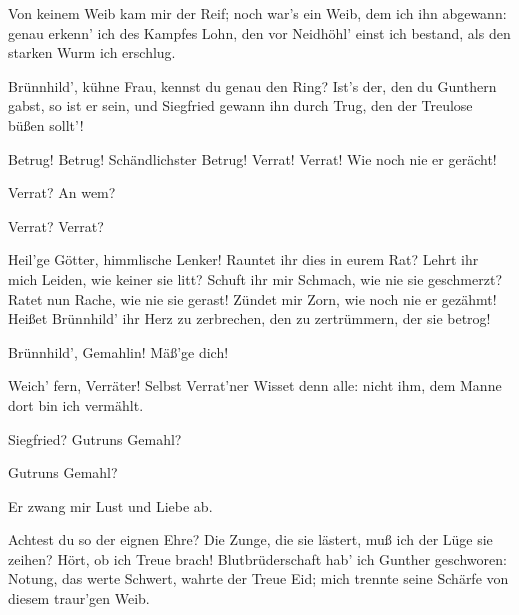 \begin{drama}


\Siegfriedspeaks

Von keinem Weib kam mir der Reif;
noch war's ein Weib, dem ich ihn abgewann:
genau erkenn' ich des Kampfes Lohn,
den vor Neidhöhl' einst ich bestand,
als den starken Wurm ich erschlug.
 

\Hagenspeaks



Brünnhild', kühne Frau,
kennst du genau den Ring?
Ist's der, den du Gunthern gabst,
so ist er sein,
und Siegfried gewann ihn durch Trug,
den der Treulose büßen sollt'!
 

\Brunnhildespeaks



Betrug! Betrug! Schändlichster Betrug!
Verrat! Verrat! Wie noch nie er gerächt!
 

\Gutrunespeaks

Verrat? An wem?
 

Verrat? Verrat?
 

\Brunnhildespeaks

Heil'ge Götter, himmlische Lenker!
Rauntet ihr dies in eurem Rat?
Lehrt ihr mich Leiden, wie keiner sie litt?
Schuft ihr mir Schmach, wie nie sie geschmerzt?
Ratet nun Rache, wie nie sie gerast!
Zündet mir Zorn, wie noch nie er gezähmt!
Heißet Brünnhild' ihr Herz zu zerbrechen,
den zu zertrümmern, der sie betrog!
 

\Guntherspeaks

Brünnhild', Gemahlin!
Mäß'ge dich!
 

\Brunnhildespeaks

Weich' fern, Verräter!
Selbst Verrat'ner
Wisset denn alle: nicht ihm,
dem Manne dort bin ich vermählt.
 

Siegfried? Gutruns Gemahl?
 

Gutruns Gemahl?
 

\Brunnhildespeaks

Er zwang mir Lust und Liebe ab.
 

\Siegfriedspeaks

Achtest du so der eignen Ehre?
Die Zunge, die sie lästert,
muß ich der Lüge sie zeihen?
Hört, ob ich Treue brach!
Blutbrüderschaft
hab' ich Gunther geschworen:
Notung, das werte Schwert,
wahrte der Treue Eid;
mich trennte seine Schärfe
von diesem traur'gen Weib.
 


\end{drama}
